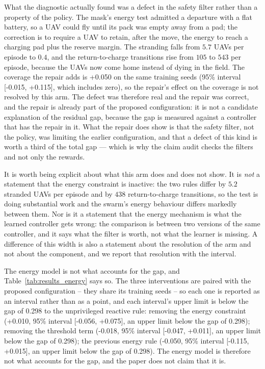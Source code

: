 What the diagnostic actually found was a defect in the safety filter rather
than a property of the policy.  The mask's energy test admitted a
departure with a flat battery, so a UAV could fly until its pack was empty
away from a pad; the correction is to require a UAV to retain, after the
move, the energy to reach a charging pad plus the reserve margin.  The
stranding falls from $5.7$ UAVs per episode to $0.4$, and
the return-to-charge transitions rise from $105$ to $543$ per
episode, because the UAVs now come home instead of dying in the field.
The coverage the repair adds is +0.050 on the same training seeds (95\% interval [-0.015, +0.115], which includes zero), so the repair's effect on the coverage is not resolved by this arm.  The defect was therefore real and the repair was
correct, and the repair is already part of the proposed configuration: it
is not a candidate explanation of the residual gap, because the gap is
measured against a controller that has the repair in it.  What the repair
does show is that the safety filter, not the policy, was limiting the
earlier configuration, and that a defect of this kind is worth a third of
the total gap --- which is why the claim audit checks the filters and not
only the rewards.

It is worth being explicit about what this arm does and does not show.
It is \emph{not} a statement that the
energy constraint is inactive: the two rules differ by $5.2$
stranded UAVs per episode and by $438$ return-to-charge
transitions, so the test is doing substantial work and the swarm's energy
behaviour differs markedly between them.  Nor is it a statement that the
energy mechanism is what the learned controller gets wrong: the
comparison is between two versions of the same controller, and it says
what the filter is worth, not what the learner is missing.  A
difference of this width is also a statement about the resolution of the
arm and not about the component, and we report that resolution with the
interval.

The energy model is not what accounts for the gap, and Table~\ref{tab:results_energy} says so.  The three interventions are paired with the proposed configuration -- they share its training seeds -- so each one is reported as an interval rather than as a point, and each interval's upper limit is below the gap of 0.298 to the unprivileged reactive rule: removing the energy constraint (+0.010, 95\% interval [-0.056, +0.075], an upper limit below the gap of 0.298); removing the threshold term (-0.018, 95\% interval [-0.047, +0.011], an upper limit below the gap of 0.298); the previous energy rule (-0.050, 95\% interval [-0.115, +0.015], an upper limit below the gap of 0.298).  The energy model is therefore not what accounts for the gap, and the paper does not claim that it is.

